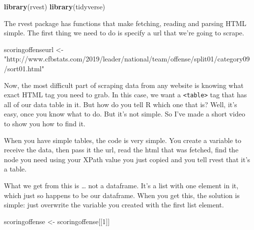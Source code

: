 \documentclass[
]{book}
\newenvironment{Shaded}{\begin{snugshade}}{\end{snugshade}}
\newcommand{\DataTypeTok}[1]{\textcolor[rgb]{0.13,0.29,0.53}{#1}}
\newcommand{\DecValTok}[1]{\textcolor[rgb]{0.00,0.00,0.81}{#1}}
\newcommand{\KeywordTok}[1]{\textcolor[rgb]{0.13,0.29,0.53}{\textbf{#1}}}
\newcommand{\NormalTok}[1]{#1}
\newcommand{\OperatorTok}[1]{\textcolor[rgb]{0.81,0.36,0.00}{\textbf{#1}}}
\newcommand{\StringTok}[1]{\textcolor[rgb]{0.31,0.60,0.02}{#1}}
\begin{document}
\begin{Shaded}
\begin{Highlighting}[]
\KeywordTok{library}\NormalTok{(rvest)}
\KeywordTok{library}\NormalTok{(tidyverse)}
\end{Highlighting}
\end{Shaded}

The rvest package has functions that make fetching, reading and parsing HTML simple. The first thing we need to do is specify a url that we're going to scrape.

\begin{Shaded}
\begin{Highlighting}[]
\NormalTok{scoringoffenseurl <-}\StringTok{ "http://www.cfbstats.com/2019/leader/national/team/offense/split01/category09/sort01.html"}
\end{Highlighting}
\end{Shaded}

Now, the most difficult part of scraping data from any website is knowing what exact HTML tag you need to grab. In this case, we want a \texttt{\textless{}table\textgreater{}} tag that has all of our data table in it. But how do you tell R which one that is? Well, it's easy, once you know what to do. But it's not simple. So I've made a short video to show you how to find it.

When you have simple tables, the code is very simple. You create a variable to receive the data, then pass it the url, read the html that was fetched, find the node you need using your XPath value you just copied and you tell rvest that it's a table.

\begin{Shaded}
\end{Shaded}

What we get from this is \ldots{} not a dataframe. It's a list with one element in it, which just so happens to be our dataframe. When you get this, the solution is simple: just overwrite the variable you created with the first list element.

\begin{Shaded}
\begin{Highlighting}[]
\NormalTok{scoringoffense <-}\StringTok{ }\NormalTok{scoringoffense[[}\DecValTok{1}\NormalTok{]]}
\end{Highlighting}
\end{Shaded}
\end{document}
